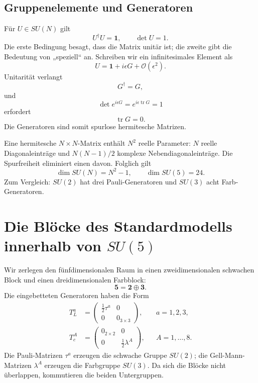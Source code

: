 \subsection{Gruppenelemente und Generatoren}

Für \(U\in SU(N)\) gilt
\begin{equation}
U^\dagger U=\mathbf1,
\qquad
\det U=1.
\label{eq:l9-SUN-def}
\end{equation}
Die erste Bedingung besagt, dass die Matrix unitär ist; die zweite gibt die Bedeutung von „speziell“ an. Schreiben wir ein infinitesimales Element als
\begin{equation}
U=\mathbf1+i\epsilon G+\mathcal O(\epsilon^2).
\label{eq:l9-infinitesimal-U}
\end{equation}
Unitarität verlangt
\begin{equation}
G^\dagger=G,
\end{equation}
und
\begin{equation}
\det e^{i\epsilon G}
=e^{i\epsilon\operatorname{tr}G}=1
\end{equation}
erfordert
\begin{equation}
\operatorname{tr}G=0.
\end{equation}
Die Generatoren sind somit spurlose hermitesche Matrizen.

Eine hermitesche \(N\times N\)-Matrix enthält \(N^2\) reelle Parameter: \(N\) reelle Diagonaleinträge und \(N(N-1)/2\) komplexe Nebendiagonaleinträge. Die Spurfreiheit eliminiert einen davon. Folglich gilt
\begin{equation}
\dim SU(N)=N^2-1,
\qquad
\dim SU(5)=24.
\label{eq:l9-SU5-dimension}
\end{equation}
Zum Vergleich: \(SU(2)\) hat drei Pauli-Generatoren und \(SU(3)\) acht Farb-Generatoren.

\section{Die Blöcke des Standardmodells innerhalb von \texorpdfstring{\(SU(5)\)}{SU(5)}}

Wir zerlegen den fünfdimensionalen Raum in einen zweidimensionalen schwachen Block und einen dreidimensionalen Farbblock:
\begin{equation}
\mathbf5=\mathbf2\oplus\mathbf3.
\end{equation}
Die eingebetteten Generatoren haben die Form
\begin{align}
T^a_L
&=
\begin{pmatrix}
\tfrac12\tau^a&0\\
0&0_{3\times3}
\end{pmatrix},
&& a=1,2,3,
\label{eq:l9-SU2-block}\\
T^A_c
&=
\begin{pmatrix}
0_{2\times2}&0\\
0&\tfrac12\lambda^A
\end{pmatrix},
&& A=1,\ldots,8.
\label{eq:l9-SU3-block}
\end{align}
Die Pauli-Matrizen \(\tau^a\) erzeugen die schwache Gruppe \(SU(2)\); die Gell-Mann-Matrizen \(\lambda^A\) erzeugen die Farbgruppe \(SU(3)\). Da sich die Blöcke nicht überlappen, kommutieren die beiden Untergruppen.

